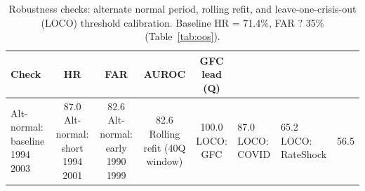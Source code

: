 \begin{table}[htbp]
\centering
\caption{Robustness checks: alternate normal period, rolling refit, and leave-one-crisis-out (LOCO) threshold calibration. Baseline HR = 71.4\%, FAR ? 35\% (Table~\ref{tab:oos}).}
\label{tab:robustness}
\begin{tabular}{lcccc}
\toprule
Check & HR & FAR & AUROC & GFC lead (Q) \\
\midrule
Alt-normal: baseline 1994 2003 & 87.0%
Alt-normal: short 1994 2001 & 82.6%
Alt-normal: early 1990 1999 & 82.6%
Rolling refit (40Q window) & 100.0%
LOCO: GFC & 87.0%
LOCO: COVID & 65.2%
LOCO: RateShock & 56.5%
\bottomrule
\end{tabular}
\end{table}
